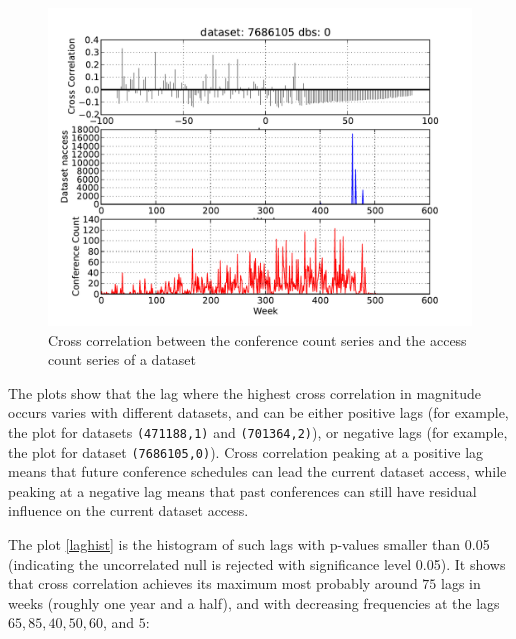\documentclass[preprint, 12pt]{elsarticle}
\begin{document}
\begin{figure}
\begin{center}
\includegraphics[scale=0.5]{../data/timeseries/datasets/7686105_0_372.pdf}
\end{center}
\caption{Cross correlation between the conference count series and the access count series of a dataset}
\label{cor3}
\end{figure}


The plots show that the lag where the highest cross correlation in magnitude occurs varies with different datasets, and can be either positive lags (for example, the plot for datasets \verb|(471188,1)| and \verb|(701364,2)|), or negative lags (for example, the plot for dataset \verb|(7686105,0)|).
Cross correlation peaking at a positive lag means that future conference schedules can lead the current dataset access, while peaking at a negative lag means that past conferences can still have residual influence on the current dataset access.


The plot \ref{laghist} is the histogram of such lags with p-values smaller than 0.05 (indicating the uncorrelated null is rejected with significance level 0.05). It shows that cross correlation achieves its maximum most probably around $75$ lags in weeks (roughly one year and a half), and with decreasing frequencies at the lags  $65, 85, 40, 50, 60$, and $5$:
 
\end{document}
